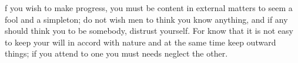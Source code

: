 f you wish to make progress, you must  be content in external matters to seem a
fool and a  simpleton; do not wish men  to think you know anything,  and if any
should think  you to be  somebody, distrust yourself. For  know that it  is not
easy to keep your will in accord with  nature and at the same time keep outward
things; if you attend to one you must needs neglect the other.
